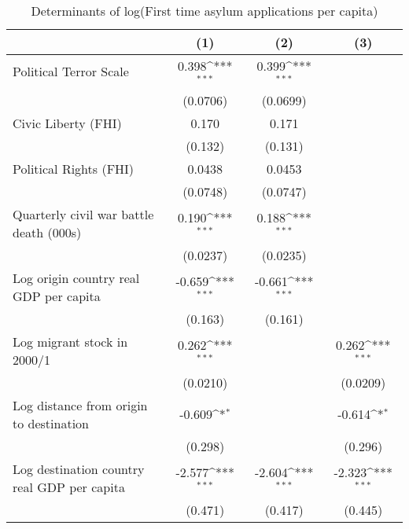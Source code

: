 \begin{table}[htbp]\centering
\def\sym#1{\ifmmode^{#1}\else\(^{#1}\)\fi}
\caption{Determinants of log(First time asylum applications per capita)}
\begin{tabular}{l*{3}{c}}
\hline\hline
                    &\multicolumn{1}{c}{(1)}         &\multicolumn{1}{c}{(2)}         &\multicolumn{1}{c}{(3)}         \\
\hline
Political Terror Scale&       0.398\sym{***}&       0.399\sym{***}&                     \\
                    &    (0.0706)         &    (0.0699)         &                     \\
[1em]
Civic Liberty (FHI) &       0.170         &       0.171         &                     \\
                    &     (0.132)         &     (0.131)         &                     \\
[1em]
Political Rights (FHI)&      0.0438         &      0.0453         &                     \\
                    &    (0.0748)         &    (0.0747)         &                     \\
[1em]
Quarterly civil war battle death (000s)&       0.190\sym{***}&       0.188\sym{***}&                     \\
                    &    (0.0237)         &    (0.0235)         &                     \\
[1em]
Log origin country real GDP per capita&      -0.659\sym{***}&      -0.661\sym{***}&                     \\
                    &     (0.163)         &     (0.161)         &                     \\
[1em]
Log migrant stock in 2000/1&       0.262\sym{***}&                     &       0.262\sym{***}\\
                    &    (0.0210)         &                     &    (0.0209)         \\
[1em]
Log distance from origin to destination&      -0.609\sym{*}  &                     &      -0.614\sym{*}  \\
                    &     (0.298)         &                     &     (0.296)         \\
[1em]
Log destination country real GDP per capita&      -2.577\sym{***}&      -2.604\sym{***}&      -2.323\sym{***}\\
                    &     (0.471)         &     (0.417)         &     (0.445)         \\

\end{tabular}
\end{table}
